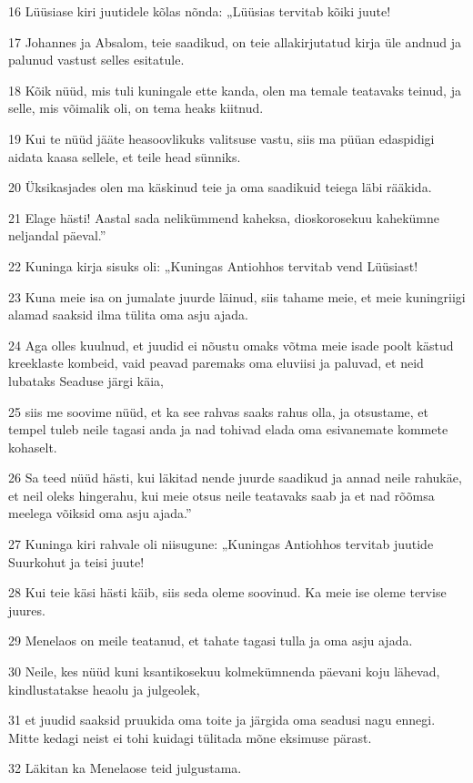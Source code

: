 \par 16 Lüüsiase kiri juutidele kõlas nõnda: „Lüüsias tervitab kõiki juute!
\par 17 Johannes ja Absalom, teie saadikud, on teie allakirjutatud kirja üle andnud ja palunud vastust selles esitatule.
\par 18 Kõik nüüd, mis tuli kuningale ette kanda, olen ma temale teatavaks teinud, ja selle, mis võimalik oli, on tema heaks kiitnud.
\par 19 Kui te nüüd jääte heasoovlikuks valitsuse vastu, siis ma püüan edaspidigi aidata kaasa sellele, et teile head sünniks.
\par 20 Üksikasjades olen ma käskinud teie ja oma saadikuid teiega läbi rääkida.
\par 21 Elage hästi! Aastal sada nelikümmend kaheksa, dioskorosekuu kahekümne neljandal päeval.”
\par 22 Kuninga kirja sisuks oli: „Kuningas Antiohhos tervitab vend Lüüsiast!
\par 23 Kuna meie isa on jumalate juurde läinud, siis tahame meie, et meie kuningriigi alamad saaksid ilma tülita oma asju ajada.
\par 24 Aga olles kuulnud, et juudid ei nõustu omaks võtma meie isade poolt kästud kreeklaste kombeid, vaid peavad paremaks oma eluviisi ja paluvad, et neid lubataks Seaduse järgi käia,
\par 25 siis me soovime nüüd, et ka see rahvas saaks rahus olla, ja otsustame, et tempel tuleb neile tagasi anda ja nad tohivad elada oma esivanemate kommete kohaselt.
\par 26 Sa teed nüüd hästi, kui läkitad nende juurde saadikud ja annad neile rahukäe, et neil oleks hingerahu, kui meie otsus neile teatavaks saab ja et nad rõõmsa meelega võiksid oma asju ajada.”
\par 27 Kuninga kiri rahvale oli niisugune: „Kuningas Antiohhos tervitab juutide Suurkohut ja teisi juute!
\par 28 Kui teie käsi hästi käib, siis seda oleme soovinud. Ka meie ise oleme tervise juures.
\par 29 Menelaos on meile teatanud, et tahate tagasi tulla ja oma asju ajada.
\par 30 Neile, kes nüüd kuni ksantikosekuu kolmekümnenda päevani koju lähevad, kindlustatakse heaolu ja julgeolek,
\par 31 et juudid saaksid pruukida oma toite ja järgida oma seadusi nagu ennegi. Mitte kedagi neist ei tohi kuidagi tülitada mõne eksimuse pärast.
\par 32 Läkitan ka Menelaose teid julgustama.
